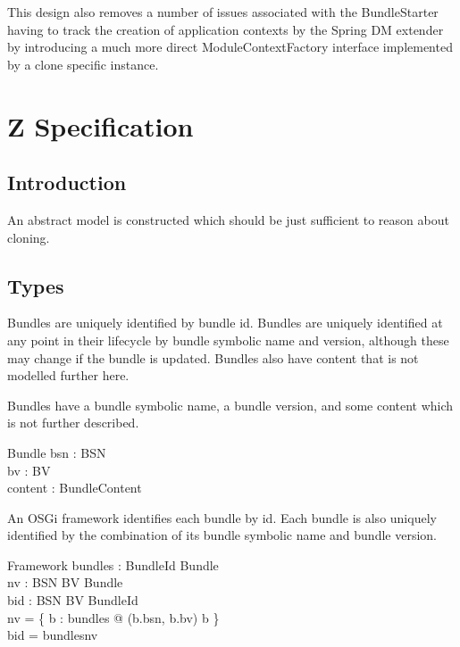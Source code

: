\documentclass[a4paper,12pt]{article}
\begin{document}
This design also removes a number of issues associated with the BundleStarter having to track
the creation of application contexts by the Spring DM extender by introducing a much more direct
ModuleContextFactory interface implemented by a clone specific instance.

\clearpage
\section{Z Specification}

\subsection{Introduction}
An abstract model is constructed which should be just sufficient to reason about cloning.

\subsection{Types}
Bundles are uniquely identified by bundle id.
Bundles are uniquely identified at any point in their
lifecycle by bundle symbolic name and version, although these may change if the bundle is updated.
Bundles also have content that is not modelled further here.
\begin{zed}
\end{zed}

Bundles have a bundle symbolic name, a bundle version, and some content which is not further
described.
\begin{schema}{Bundle}
bsn : BSN \\
bv : BV \\
content : BundleContent \\
\end{schema}

An OSGi framework identifies each bundle by id. Each bundle is also uniquely identified by
the combination of its bundle symbolic name and bundle version.
\begin{schema}{Framework}
bundles : BundleId \pinj Bundle \\
nv : BSN \cross BV \pinj Bundle \\
bid : BSN \cross BV \pinj BundleId \\
\where
nv = \{ b : \ran bundles @ (b.bsn, b.bv) \mapsto b \} \\
bid = bundles\inv \circ nv \\
\end{schema}
\end{document}
